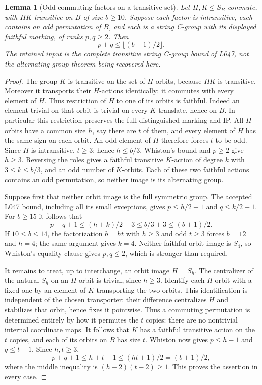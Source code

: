 \documentclass[11pt,a4paper]{article}
\newtheorem{lemma}{Lemma}
\begin{document}
\begin{lemma}[Odd commuting factors on a transitive set]\label{oddproduct}
Let $H,K\leq S_B$ commute, with $HK$ transitive on $B$ of size
$b\geq10$. Suppose each factor is intransitive, each contains an
odd permutation of $B$, and each is a string C-group with its
displayed faithful marking, of ranks $p,q\geq2$. Then
\[
                         p+q\leq\lfloor(b-1)/2\rfloor.
\]
The retained input is the complete transitive string C-group bound
of L047, not the alternating-group theorem being recovered here.
\end{lemma}
\begin{proof}
The group $K$ is transitive on the set of $H$-orbits, because $HK$
is transitive. Moreover it transports their $H$-actions identically:
it commutes with every element of $H$. Thus restriction of $H$ to
one of its orbits is faithful. Indeed an element trivial on that
orbit is trivial on every $K$-translate, hence on $B$. In particular
this restriction preserves the full distinguished marking and IP.
All $H$-orbits have a common size $h$, say there are $t$ of them,
and every element of $H$ has the same sign on each orbit. An odd
element of $H$ therefore forces $t$ to be odd. Since $H$ is
intransitive, $t\geq3$; hence $h\leq b/3$. Whiston's bound and
$p\geq2$ give $h\geq3$. Reversing the roles gives a faithful
transitive $K$-action of degree $k$ with $3\leq k\leq b/3$,
and an odd number of $K$-orbits. Each of these two faithful actions
contains an odd permutation, so neither image is its alternating
group.

Suppose first that neither orbit image is the full symmetric group.
The accepted L047 bound, including all its small exceptions, gives
$p\leq h/2+1$ and $q\leq k/2+1$. For $b\geq15$ it follows that
\[
 p+q+1\leq(h+k)/2+3\leq b/3+3\leq(b+1)/2.
\]
If $10\leq b\leq14$, the factorization $b=ht$ with $h\geq3$
and odd $t\geq3$ forces $b=12$ and $h=4$; the same argument
gives $k=4$. Neither faithful orbit image is $S_4$, so Whiston's
equality clause gives $p,q\leq2$, which is stronger than required.

It remains to treat, up to interchange, an orbit image $H=S_h$.
The centralizer of the natural $S_h$ on an $H$-orbit is trivial,
since $h\geq3$. Identify each $H$-orbit with a fixed one by an
element of $K$ transporting the two orbits. This identification is
independent of the chosen transporter: their difference centralizes
$H$ and stabilizes that orbit, hence fixes it pointwise. Thus a commuting
permutation is determined entirely by how it permutes the $t$
copies: there are no nontrivial internal coordinate maps. It follows
that $K$ has a faithful transitive action on the $t$ copies, and
each of its orbits on $B$ has size $t$. Whiston now gives
$p\leq h-1$ and $q\leq t-1$. Since $h,t\geq3$,
\[
 p+q+1\leq h+t-1\leq(ht+1)/2=(b+1)/2,
\]
where the middle inequality is $(h-2)(t-2)\geq1$.
This proves the assertion in every case.
\end{proof}
\end{document}
